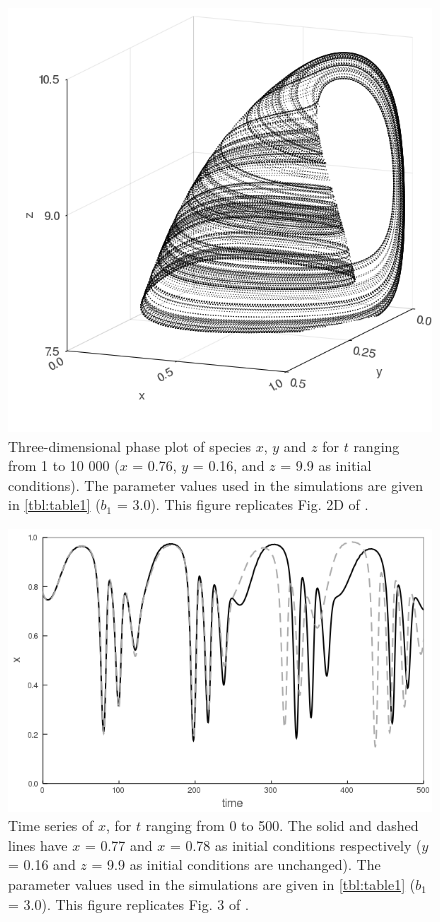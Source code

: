 \newpage

\begin{figure}
  \centering
  \includegraphics[scale=0.7]{figures/fig2d.png}
  \caption{Three-dimensional phase plot of species $x$, $y$ and $z$ for $t$ ranging from 1 to 10 000 ($x$ = 0.76, $y$ = 0.16, and $z$ = 9.9 as initial conditions). The parameter values used in the simulations are given in \autoref{tbl:table1} ($b_1$ = 3.0). This figure replicates Fig. 2D of \citet{hastings1991}.}
  \label{fig:fig2d}
\end{figure}

\newpage

\begin{figure}
  \centering
  \includegraphics[scale=0.7]{figures/fig3.png}
  \caption{Time series of $x$, for $t$ ranging from 0 to 500. The solid and dashed lines have  $x$ = 0.77 and $x$ = 0.78 as initial conditions respectively ($y$ = 0.16 and $z$ = 9.9 as initial conditions are unchanged). The parameter values used in the simulations are given in \autoref{tbl:table1} ($b_1$ = 3.0). This figure replicates Fig. 3 of \citet{hastings1991}.}
  \label{fig:fig3}
\end{figure}

